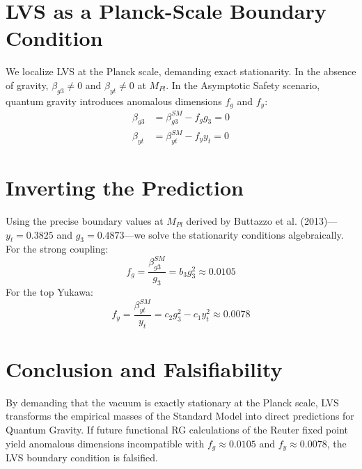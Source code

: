 \documentclass[11pt,a4paper]{article}
\begin{document}
\section{LVS as a Planck-Scale Boundary Condition}
We localize LVS at the Planck scale, demanding exact stationarity. In the absence of gravity, $\beta_{g3} \neq 0$ and $\beta_{yt} \neq 0$ at $M_{Pl}$. In the Asymptotic Safety scenario, quantum gravity introduces anomalous dimensions $f_g$ and $f_y$:
\begin{align}
\beta_{g3} &= \beta_{g3}^{SM} - f_g g_3 = 0 \\
\beta_{yt} &= \beta_{yt}^{SM} - f_y y_t = 0
\end{align}

\section{Inverting the Prediction}
Using the precise boundary values at $M_{Pl}$ derived by Buttazzo et al. (2013)---$y_t = 0.3825$ and $g_3 = 0.4873$---we solve the stationarity conditions algebraically.
For the strong coupling:
\begin{equation}
f_g = \frac{\beta_{g3}^{SM}}{g_3} = b_3 g_3^2 \approx 0.0105
\end{equation}
For the top Yukawa:
\begin{equation}
f_y = \frac{\beta_{yt}^{SM}}{y_t} = c_2 g_3^2 - c_1 y_t^2 \approx 0.0078
\end{equation}

\section{Conclusion and Falsifiability}
By demanding that the vacuum is exactly stationary at the Planck scale, LVS transforms the empirical masses of the Standard Model into direct predictions for Quantum Gravity. If future functional RG calculations of the Reuter fixed point yield anomalous dimensions incompatible with $f_g \approx 0.0105$ and $f_y \approx 0.0078$, the LVS boundary condition is falsified.
\end{document}
